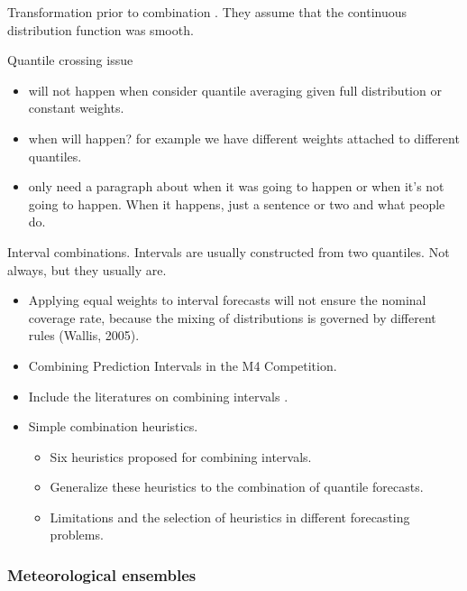 \documentclass[11pt]{article}
\begin{document}
Transformation prior to combination \citep{Zhang2020-dm}. They assume that the continuous distribution function was smooth.

Quantile crossing issue
\begin{itemize}
  \item will not happen when consider quantile averaging given full distribution or constant weights.
  \item when will happen? for example we have different weights attached to different quantiles.
  \item only need a paragraph about when it was going to happen or when it's not going to happen. When it happens, just a sentence or two and what people do.
\end{itemize}

Interval combinations. Intervals are usually constructed from two quantiles. Not always, but they usually are.
\begin{itemize}
  \item Applying equal weights to interval forecasts will not ensure the nominal coverage rate, because the mixing of distributions is governed by different rules (Wallis, 2005).
  \item Combining Prediction Intervals in the M4 Competition.
  \item Include the literatures on combining intervals \citep[e.g.,][]{Wallis2005-yf,Lichtendahl2013-rt,Park2015-zn,Gaba2017-om,Grushka-Cockayne2017-dj,Grushka-Cockayne2020-qv}.
  \item Simple combination heuristics.
  \begin{itemize}
    \item Six heuristics \citep{Park2015-zn,Gaba2017-om,Grushka-Cockayne2020-qv} proposed for combining intervals.
    \item Generalize these heuristics to the combination of quantile forecasts.
    \item Limitations and the selection of heuristics in different forecasting problems.
  \end{itemize}
\end{itemize}

\subsubsection{Meteorological ensembles}
\label{sec:meteorological_ensembles}
\end{document}
